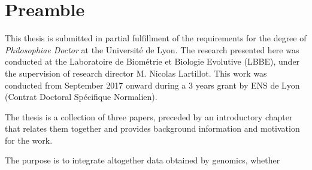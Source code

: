 \chapter*{Preamble}

This thesis is submitted in partial fulfillment of the requirements
for the degree of \emph{Philosophiae Doctor} at the Université de Lyon.
The research presented here was conducted at the Laboratoire de Biométrie et Biologie Evolutive (LBBE), under the supervision of research director M. Nicolas Lartillot.
This work was conducted from September 2017 onward during a 3 years grant by ENS de Lyon (Contrat Doctoral Spécifique Normalien).

The thesis is a collection of three papers, preceded by an introductory chapter that relates them together and provides background information and motivation for the work.


The purpose is to integrate altogether data obtained by genomics, whether 
